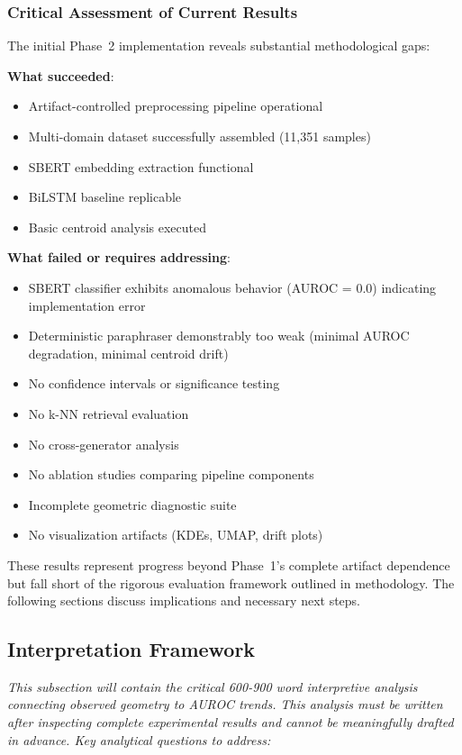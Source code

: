 \documentclass[conference]{IEEEtran}
\begin{document}
\subsubsection{Critical Assessment of Current Results}

The initial Phase~2 implementation reveals substantial methodological gaps:

\textbf{What succeeded}:
\begin{itemize}
    \item Artifact-controlled preprocessing pipeline operational
    \item Multi-domain dataset successfully assembled (11,351 samples)
    \item SBERT embedding extraction functional
    \item BiLSTM baseline replicable
    \item Basic centroid analysis executed
\end{itemize}

\textbf{What failed or requires addressing}:
\begin{itemize}
    \item SBERT classifier exhibits anomalous behavior (AUROC = 0.0) indicating implementation error
    \item Deterministic paraphraser demonstrably too weak (minimal AUROC degradation, minimal centroid drift)
    \item No confidence intervals or significance testing
    \item No k-NN retrieval evaluation
    \item No cross-generator analysis
    \item No ablation studies comparing pipeline components
    \item Incomplete geometric diagnostic suite
    \item No visualization artifacts (KDEs, UMAP, drift plots)
\end{itemize}

These results represent progress beyond Phase~1's complete artifact dependence but fall short of the rigorous evaluation framework outlined in methodology. The following sections discuss implications and necessary next steps.

\subsection{Interpretation Framework}

\emph{This subsection will contain the critical 600-900 word interpretive analysis connecting observed geometry to AUROC trends. This analysis must be written after inspecting complete experimental results and cannot be meaningfully drafted in advance. Key analytical questions to address:}
\end{document}
